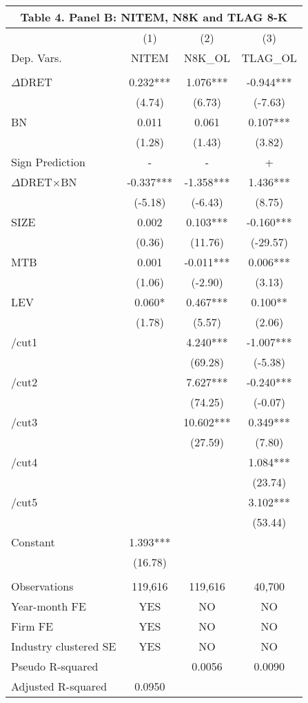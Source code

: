 \begin{table}[htbp] \label{T4PB}
  \centering
    \begin{tabular}{lccc}
    \multicolumn{4}{c}{\textbf{Table 4. Panel B: NITEM, N8K and TLAG 8-K}} \\
    \midrule
      & (1) & (2) & (3) \\
    Dep. Vars. & NITEM & N8K\_OL & TLAG\_OL \\
    \midrule
      &   &   &  \\
    $\Delta$DRET & 0.232*** & 1.076*** & -0.944*** \\
    & (4.74) & (6.73) & (-7.63) \\
    BN & 0.011 & 0.061 & 0.107*** \\
    & (1.28) & (1.43) & (3.82) \\
    \rowcolor[rgb]{ .933,  .925,  .882} Sign Prediction & - & - & + \\
    \rowcolor[rgb]{ .933,  .925,  .882} $\Delta$DRET$\times$BN & -0.337*** & -1.358*** & 1.436*** \\
    \rowcolor[rgb]{ .933,  .925,  .882}   & (-5.18) & (-6.43) & (8.75) \\
    SIZE & 0.002 & 0.103*** & -0.160*** \\
    & (0.36) & (11.76) & (-29.57) \\
    MTB & 0.001 & -0.011*** & 0.006*** \\
    & (1.06) & (-2.90) & (3.13) \\
    LEV & 0.060* & 0.467*** & 0.100** \\
    & (1.78) & (5.57) & (2.06) \\
    /cut1 &   & 4.240*** & -1.007*** \\
    &   & (69.28) & (-5.38) \\
    /cut2 &   & 7.627*** & -0.240*** \\
    &   & (74.25) & (-0.07) \\
    /cut3 &   & 10.602*** & 0.349*** \\
    &   & (27.59) & (7.80) \\
    /cut4 &   &   & 1.084*** \\
    &   &   & (23.74) \\
    /cut5 &   &   & 3.102*** \\
    &   &   & (53.44) \\
    Constant & 1.393*** &   &  \\
    & (16.78) &   &  \\
    &   &   &  \\
    Observations & 119,616 & 119,616 & 40,700 \\
    Year-month FE & YES & NO & NO \\
    Firm FE & YES & NO & NO \\
    Industry clustered SE & YES & NO & NO \\
    Pseudo R-squared & & 0.0056 & 0.0090 \\
    Adjusted R-squared & 0.0950 &   &  \\
    \bottomrule
    
    \end{tabular}%
\end{table}%